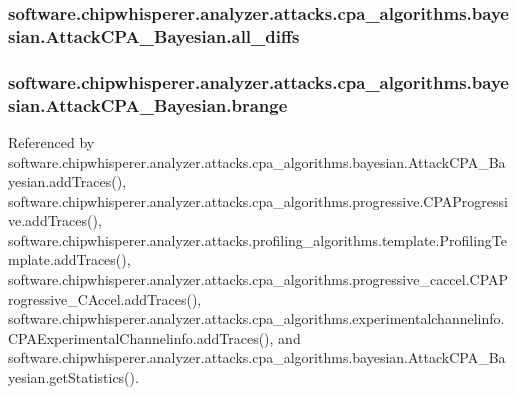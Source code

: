 \subsubsection[{all\+\_\+diffs}]{\setlength{\rightskip}{0pt plus 5cm}software.\+chipwhisperer.\+analyzer.\+attacks.\+cpa\+\_\+algorithms.\+bayesian.\+Attack\+C\+P\+A\+\_\+\+Bayesian.\+all\+\_\+diffs}\label{classsoftware_1_1chipwhisperer_1_1analyzer_1_1attacks_1_1cpa__algorithms_1_1bayesian_1_1AttackCPA__Bayesian_a5532b7afae0ffa6daa7b093765505da9}
\hypertarget{classsoftware_1_1chipwhisperer_1_1analyzer_1_1attacks_1_1cpa__algorithms_1_1bayesian_1_1AttackCPA__Bayesian_af7bc6ec8a96232a156c4037e096d0b4f}{}
\subsubsection[{brange}]{\setlength{\rightskip}{0pt plus 5cm}software.\+chipwhisperer.\+analyzer.\+attacks.\+cpa\+\_\+algorithms.\+bayesian.\+Attack\+C\+P\+A\+\_\+\+Bayesian.\+brange}\label{classsoftware_1_1chipwhisperer_1_1analyzer_1_1attacks_1_1cpa__algorithms_1_1bayesian_1_1AttackCPA__Bayesian_af7bc6ec8a96232a156c4037e096d0b4f}


Referenced by software.\+chipwhisperer.\+analyzer.\+attacks.\+cpa\+\_\+algorithms.\+bayesian.\+Attack\+C\+P\+A\+\_\+\+Bayesian.\+add\+Traces(), software.\+chipwhisperer.\+analyzer.\+attacks.\+cpa\+\_\+algorithms.\+progressive.\+C\+P\+A\+Progressive.\+add\+Traces(), software.\+chipwhisperer.\+analyzer.\+attacks.\+profiling\+\_\+algorithms.\+template.\+Profiling\+Template.\+add\+Traces(), software.\+chipwhisperer.\+analyzer.\+attacks.\+cpa\+\_\+algorithms.\+progressive\+\_\+caccel.\+C\+P\+A\+Progressive\+\_\+\+C\+Accel.\+add\+Traces(), software.\+chipwhisperer.\+analyzer.\+attacks.\+cpa\+\_\+algorithms.\+experimentalchannelinfo.\+C\+P\+A\+Experimental\+Channelinfo.\+add\+Traces(), and software.\+chipwhisperer.\+analyzer.\+attacks.\+cpa\+\_\+algorithms.\+bayesian.\+Attack\+C\+P\+A\+\_\+\+Bayesian.\+get\+Statistics().

